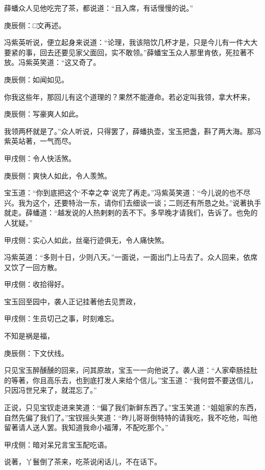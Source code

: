 \begin{parag}
    薛蟠众人见他吃完了茶，都说道：“且入席，有话慢慢的说。”\begin{note}庚辰侧：□文再述。\end{note}冯紫英听说，便立起身来说道：“论理，我该陪饮几杯才是，只是今儿有一件大大要紧的事，回去还要见家父面回，实不敢领。”薛蟠宝玉众人那里肯依，死拉著不放。冯紫英笑道：“这又奇了。\begin{note}庚辰侧：如闻如见。\end{note}你我这些年，那回儿有这个道理的？果然不能遵命。若必定叫我领，拿大杯来，\begin{note}庚辰侧：写豪爽人如此。\end{note}我领两杯就是了。”众人听说，只得罢了，薛蟠执壶，宝玉把盏，斟了两大海。那冯紫英站著，一气而尽。\begin{note}甲戌侧：令人快活煞。\end{note}\begin{note}庚辰侧：爽快人如此，令人羡煞。\end{note}宝玉道：“你到底把这个‘不幸之幸’说完了再走。”冯紫英笑道：“今儿说的也不尽兴。我为这个，还要特治一东，请你们去细谈一谈；二则还有所恳之处。”说著执手就走。薛蟠道：“越发说的人热剌剌的丢不下。多早晚才请我们，告诉了。也免的人犹疑。”\begin{note}甲戌侧：实心人如此，丝毫行迹俱无，令人痛快煞。\end{note}冯紫英道：“多则十日，少则八天。”一面说，一面出门上马去了。众人回来，依席又饮了一回方散。\begin{note}甲戌侧：收拾得好。\end{note}
\end{parag}


\begin{parag}
    宝玉回至园中，袭人正记挂著他去见贾政，\begin{note}甲戌侧：生员切己之事，时刻难忘。\end{note}不知是祸是福，\begin{note}庚辰侧：下文伏线。\end{note}只见宝玉醉醺醺的回来，问其原故，宝玉一一向他说了。袭人道：“人家牵肠挂肚的等著，你且高乐去，也到底打发人来给个信儿。”宝玉道：“我何尝不要送信儿，只因冯世兄来了，就混忘了。”
\end{parag}


\begin{parag}
    正说，只见宝钗走进来笑道：“偏了我们新鲜东西了。”宝玉笑道：“姐姐家的东西，自然先偏了我们了。”宝钗摇头笑道：“昨儿哥哥倒特特的请我吃，我不吃他，叫他留著请人送人罢。我知道我命小福薄，不配吃那个。”\begin{note}甲戌侧：暗对呆兄言宝玉配吃语。\end{note}说著，丫鬟倒了茶来，吃茶说闲话儿，不在话下。
\end{parag}


